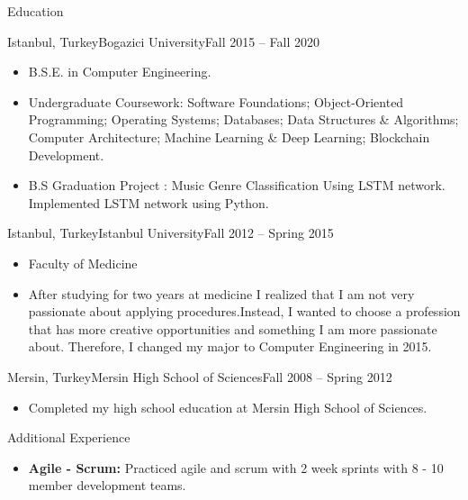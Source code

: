 \documentclass[]{mcdowellcv}
\begin{document}
    \vspace{\baselineskip}
	
	\begin{cvsection}{Education}
		\begin{cvsubsection}{Istanbul, Turkey}{Bogazici University}{Fall 2015 -- Fall 2020}
			\begin{itemize}
				\item B.S.E. in Computer Engineering.
				\item Undergraduate Coursework: Software Foundations; Object-Oriented Programming; Operating Systems; Databases; Data Structures \& Algorithms; Computer Architecture; Machine Learning \& Deep Learning; \linebreak Blockchain Development.
				\item B.S Graduation Project : Music Genre Classification Using LSTM network. Implemented LSTM network using Python.
			\end{itemize}
		\end{cvsubsection}
		
		\begin{cvsubsection}{Istanbul, Turkey}{Istanbul University}{Fall 2012 -- Spring 2015}
			\begin{itemize}
				\item Faculty of Medicine
				\item After studying for two years at medicine I realized that I am not very passionate about applying procedures.\linebreak Instead, I wanted to choose a profession that has more creative opportunities and something I am more passionate about. Therefore, I changed my major to Computer Engineering in 2015.
			\end{itemize}
		\end{cvsubsection}
		
		\begin{cvsubsection}{Mersin, Turkey}{Mersin High School of Sciences}{Fall 2008 -- Spring 2012}
			\begin{itemize}
				\item Completed my high school education at Mersin High School of Sciences.
			\end{itemize}
		\end{cvsubsection}
	\end{cvsection}
	
	\begin{cvsection}{Additional Experience}
		\begin{cvsubsection}{}{}{}
			\begin{itemize}
				\item \textbf{Agile - Scrum:} Practiced agile and scrum with 2 week sprints with 8 - 10 member development teams.
			\end{itemize}
		\end{cvsubsection}
	\end{cvsection}
	
\end{document}

